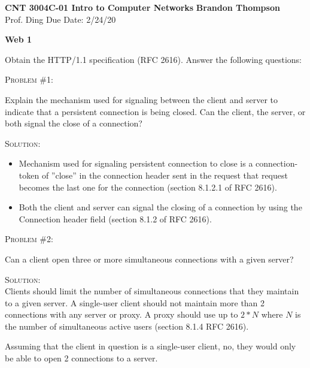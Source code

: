 \documentclass[12pt]{article}
\newenvironment{problem}[1]
{\begin{mdframed}[linewidth=0.8pt]
        \textsc{Problem #1:}

}
    {\end{mdframed}}
\newenvironment{solution}
    {\textsc{Solution:}\\}
    {\newpage}%
\begin{document}
\noindent
\textbf{CNT 3004C-01 Intro to Computer Networks} \hfill \textbf{Brandon Thompson} \\
\normalsize Prof. Ding \hfill Due Date: 2/24/20 \\

\begin{center}
\textbf{Web 1}
\end{center}
	Obtain the HTTP/1.1 specification (RFC 2616). Answer the following questions:
	\begin{problem}{\#1}
		Explain the mechanism used for signaling between the client and server
		to indicate that a persistent connection is being closed. Can the
		client, the server, or both signal the close of a connection?
	\end{problem}
	\begin{solution}
		\begin{itemize}
			\item Mechanism used for signaling persistent connection to close
				is a connection-token of ''close'' in the connection
				header sent in the request that request becomes the last
				one for the connection (section 8.1.2.1 of RFC 2616).
			\item Both the client and server can signal the closing of a
				connection by using the Connection header field 
				(section 8.1.2 of RFC 2616).
		\end{itemize}
	\end{solution}

	\begin{problem}{\#2}
		Can a client open three or more simultaneous connections with a given server?
	\end{problem}
	\begin{solution}
		Clients should limit the number of simultaneous connections that they
		maintain to a given server. A single-user client should not maintain
		more than 2 connections with any server or proxy. A proxy should use
		up to $2*N$ where $ N$ is the number of simultaneous active users
		(section 8.1.4 RFC 2616).

		Assuming that the client in question is a single-user client, no,
		they would only be able to open 2 connections to a server.
	\end{solution}
\end{document}
